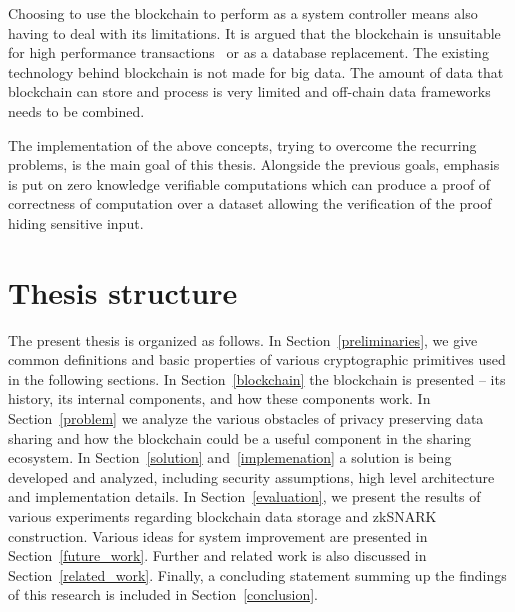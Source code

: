 Choosing to use the blockchain to perform as a system controller means also having to deal with its limitations. It is argued that the blockchain is unsuitable for high performance transactions~\cite{Sompolinsky2015,Zohar:2015:BUH:2817191.2701411} or as a database replacement. The existing technology behind blockchain is not made for big data. The amount of data that blockchain can store and process is very limited and off-chain data frameworks needs to be combined.

The implementation of the above concepts, trying to overcome the recurring problems, is the main goal of this thesis. Alongside the previous goals, emphasis is put on zero knowledge verifiable computations which can produce a proof of correctness of computation over a dataset allowing the verification of the proof hiding sensitive input.


\section{Thesis structure}
\label{introduction:structure}

The present thesis is organized as follows. In Section~\ref{preliminaries}, we give common definitions and basic properties of various cryptographic primitives used in the following sections. In Section~\ref{blockchain} the blockchain is presented -- its history, its internal components, and how these components work. In Section~\ref{problem} we analyze the various obstacles of privacy preserving data sharing and how the blockchain could be a useful component in the sharing ecosystem. In Section~\ref{solution} and~\ref{implemenation} a solution is being developed and analyzed, including security assumptions, high level architecture and implementation details. In Section~\ref{evaluation}, we present the results of various experiments regarding blockchain data storage and zkSNARK construction. Various ideas for system improvement are presented in Section~\ref{future_work}. Further and related work is also discussed in Section~\ref{related_work}. Finally, a concluding statement summing up the findings of this research is included in Section~\ref{conclusion}.
